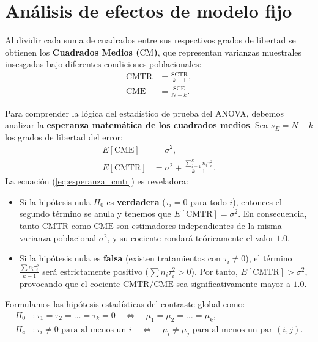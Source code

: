 \section{Análisis de efectos de modelo fijo}

Al dividir cada suma de cuadrados entre sus respectivos grados de libertad se obtienen los \textbf{Cuadrados Medios ($\text{CM}$)}, que representan varianzas muestrales insesgadas bajo diferentes condiciones poblacionales:
\begin{align}
	\text{CMTR} &= \frac{\text{SCTR}}{k - 1}, \\
	\text{CME} &= \frac{\text{SCE}}{N - k}.
\end{align}

Para comprender la lógica del estadístico de prueba del ANOVA, debemos analizar la \textbf{esperanza matemática de los cuadrados medios}. Sea $\nu_E = N - k$ los grados de libertad del error:
\begin{align}
	E[\text{CME}] &= \sigma^2, \\
	E[\text{CMTR}] &= \sigma^2 + \frac{\sum_{i=1}^k n_i \tau_i^2}{k - 1}.
	\label{eq:esperanza_cmtr}
\end{align}
La ecuación (\ref{eq:esperanza_cmtr}) es reveladora:
\begin{itemize}
	\item Si la hipótesis nula $H_0$ es \textbf{verdadera} ($\tau_i = 0$ para todo $i$), entonces el segundo término se anula y tenemos que $E[\text{CMTR}] = \sigma^2$. En consecuencia, tanto $\text{CMTR}$ como $\text{CME}$ son estimadores independientes de la misma varianza poblacional $\sigma^2$, y su cociente rondará teóricamente el valor $1.0$.
	\item Si la hipótesis nula es \textbf{falsa} (existen tratamientos con $\tau_i \neq 0$), el término $\frac{\sum n_i \tau_i^2}{k-1}$ será estrictamente positivo ($\sum n_i \tau_i^2 > 0$). Por tanto, $E[\text{CMTR}] > \sigma^2$, provocando que el cociente $\text{CMTR} / \text{CME}$ sea significativamente mayor a $1.0$.
\end{itemize}

Formulamos las hipótesis estadísticas del contraste global como:
\begin{align}
	H_0&: \tau_1 = \tau_2 = \ldots = \tau_k = 0 \quad \Longleftrightarrow \quad \mu_1 = \mu_2 = \ldots = \mu_k, \\
	H_a&: \tau_i \neq 0 \text{ para al menos un } i \quad \Longleftrightarrow \quad \mu_i \neq \mu_j \text{ para al menos un par } (i,j).
\end{align}

